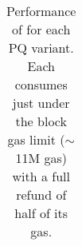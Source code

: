 \begin{table}[t]
\begin{tabular} {|>{\centering}m{2.5cm} |>{\centering}m{0.5cm} |>{\centering}m{1.5cm} |>{\centering}m{1.8cm} |>{\centering\arraybackslash}m{1.5cm}|}
\end{tabular}
\caption{Performance of \cm for each PQ variant. Each consumes just under the block gas limit ($\sim$11M gas) with a full refund of half of its gas.\label{tab:worst_case_matching}}

\end{table}


